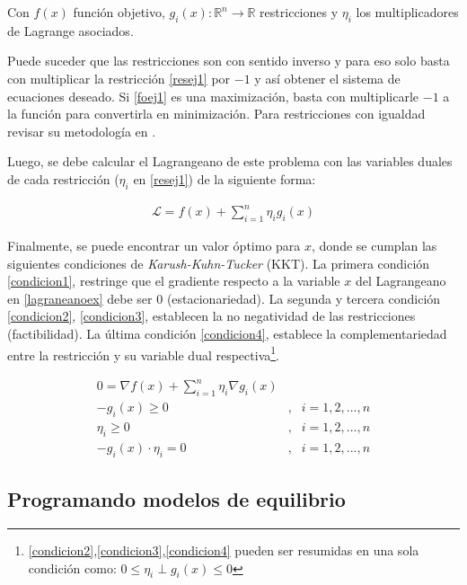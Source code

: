 Con $f(x)$ función objetivo,  $g_{i}(x):\mathbb{R}^n \rightarrow \mathbb{R}$ restricciones y $\eta_i$ los multiplicadores de Lagrange asociados. 
\vspace{2.5mm}

Puede suceder que las restricciones son con sentido inverso y para eso solo basta con multiplicar la restricción \ref{resej1} por $-1$ y así obtener el sistema de ecuaciones deseado. Si \ref{foej1} es una maximización, basta con multiplicarle $-1$ a la función para convertirla en minimización. Para restricciones con igualdad revisar su metodología en .
\vspace{2.5mm}

Luego, se debe calcular el Lagrangeano de este problema con las variables duales de cada restricción ($\eta_{i}$ en \ref{resej1}) de la siguiente forma:

\begin{align}
    \mathcal{L}=f(x) +  \sum_{i=1}^{n}\eta_{i}g_{i}(x)\label{lagraneanoex}
\end{align}

Finalmente, se puede encontrar un valor óptimo para $x$, donde se cumplan las siguientes condiciones de \textit{Karush-Kuhn-Tucker} (KKT). La primera condición \ref{condicion1}, restringe que el gradiente respecto a la variable $x$ del Lagrangeano en \ref{lagraneanoex} debe ser 0 (estacionariedad). La segunda y tercera condición \ref{condicion2}, \ref{condicion3}, establecen la no negatividad de las restricciones (factibilidad). La última condición \ref{condicion4}, establece la complementariedad entre la restricción y su variable dual respectiva\footnote{\ref{condicion2},\ref{condicion3},\ref{condicion4} pueden ser resumidas en una sola condición como: $0\leq\eta_{i}\perp g_{i}(x)\leq 0$}. 

\begin{align}
    0 = \nabla f(x) + \sum_{i=1}^{n} \eta_{i}\nabla g_{i}(x) \label{condicion1}\\
    -g_{i}(x) \geq 0 &, & i=1,2,...,n  \label{condicion2}\\
    \eta_{i} \geq 0 &, & i=1,2,...,n \label{condicion3}\\
    -g_{i}(x)\cdot \eta_{i} = 0 &, & i=1,2,...,n \label{condicion4}
\end{align}

\subsection{Programando modelos de equilibrio}\label{explisolvers}

